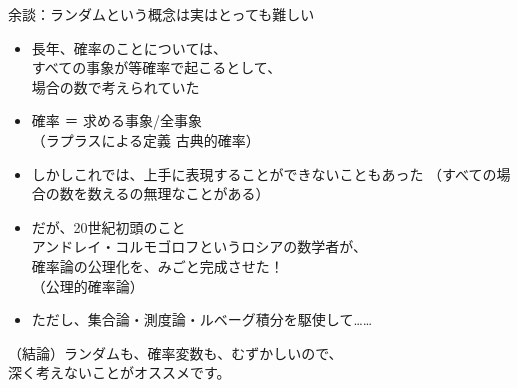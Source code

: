 \documentclass[dvipdfmx,cjk]{beamer}
\begin{document}
\begin{frame}{余談：ランダムという概念は実はとっても難しい} \pause


\begin{itemize}
    \item 長年、確率のことについては、\\
    すべての事象が等確率で起こるとして、\\
    場合の数で考えられていた \pause
    \item 確率 ＝ 求める事象/全事象 \\
    （ラプラスによる定義 古典的確率） \pause
    \item しかしこれでは、上手に表現することができないこともあった
    （すべての場合の数を数えるの無理なことがある） \pause

    \item だが、20世紀初頭のこと \\ \pause
    アンドレイ・コルモゴロフというロシアの数学者が、 \\
    確率論の公理化を、みごと完成させた！\\
    （公理的確率論） \pause

    \item ただし、集合論・測度論・ルベーグ積分を駆使して……  \pause
\end{itemize}


\vskip 1cm

（結論）ランダムも、確率変数も、むずかしいので、\\
深く考えないことがオススメです。


\end{frame}
\end{document}
